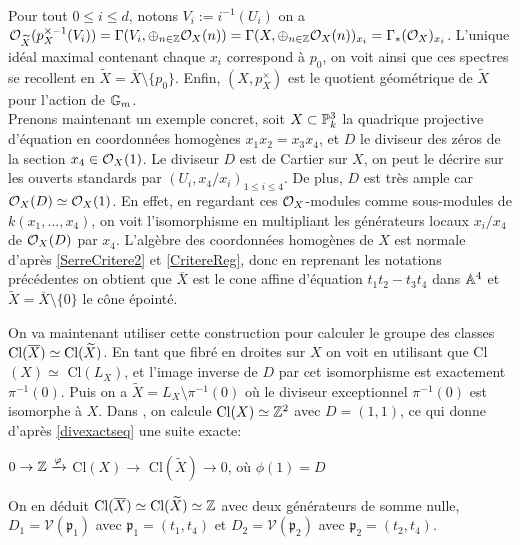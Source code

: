 	\begin{center}
	\\
	\end{center}
Pour tout $0\leq i\leq d$, notons $V_i:=i^{-1}(U_i)$ on a  $\mathcal{O}_{\widetilde{X}}(p_X^{\times-1}(V_i))=\Gamma(V_i,\oplus_{n\in \mathbb{Z}}\mathcal{O}_X(n))=\Gamma(X,\oplus_{n\in \mathbb{Z}}\mathcal{O}_X(n))_{x_i}=\Gamma_*(\mathcal{O}_X)_{x_i}$. L'unique idéal maximal contenant chaque $x_i$ correspond à $p_0$, on voit ainsi que ces spectres se recollent en $\widetilde{X}=\overline{X}\setminus \lbrace p_0 \rbrace$. Enfin, $(X,p^\times_X)$ est le quotient géométrique de $\widetilde{X}$ pour l'action de $\mathbb{G}_m$.\\

Prenons maintenant un exemple concret, soit $X\subset \mathbb{P}^3_k$ la quadrique projective d'équation en coordonnées homogènes $x_1x_2=x_3x_4$, et $D$ le diviseur des zéros de la section $x_4\in\mathcal{O}_X(1)$. Le diviseur $D$ est de Cartier sur $X$, on peut le décrire sur les ouverts standards par $(U_i, x_4/x_i)_{1\leq i\leq 4}$. De plus, $D$ est très ample car $\mathcal{O}_X(D)\simeq \mathcal{O}_X(1)$. En effet, en regardant ces $\mathcal{O}_X$-modules comme sous-modules de $k(x_1,...,x_4)$, on voit l'isomorphisme en multipliant les générateurs locaux $x_i/x_4$ de $\mathcal{O}_X(D)$ par $x_4$. L'algèbre des coordonnées homogènes de $X$ est normale d'après \ref{SerreCritere2} et \ref{CritereReg}, donc en reprenant les notations précédentes on obtient que $\overline{X}$ est le cone affine d'équation $t_1t_2-t_3t_4$ dans $\mathbb{A}^4$ et $\widetilde{X}=\overline{X}\setminus\lbrace 0 \rbrace$ le cône épointé. 

On va maintenant utiliser cette construction pour calculer le groupe des classes $\operatorname{Cl}(\overline{X})\simeq \operatorname{Cl}(\widetilde{X})$. En tant que fibré en droites sur $X$ on voit en utilisant \cite[II.6.6]{Hartshorne} que Cl$(X)\simeq$ Cl$(L_X)$, et l'image inverse de $D$ par cet isomorphisme est exactement $\pi^{-1}(0)$. Puis on a $\widetilde{X}=L_X \setminus \pi^{-1}(0)$ où le diviseur exceptionnel $\pi^{-1}(0)$ est isomorphe à $X$. Dans \cite[II.6.6.1]{Hartshorne}, on calcule $\operatorname{Cl}(X)\simeq \mathbb{Z}^2$ avec $D=(1,1)$, ce qui donne d'après \ref{divexactseq} une suite exacte:
\begin{center}
$ 0\rightarrow\mathbb{Z}\xrightarrow{\varphi}$ Cl$(X) \rightarrow$ Cl$(\widetilde{X}) \rightarrow 0$, où $\phi(1)=D$
\end{center}
On en déduit $\operatorname{Cl}(\overline{X})\simeq\operatorname{Cl}(\widetilde{X})\simeq \mathbb{Z}$ avec deux générateurs de somme nulle, $D_1=\mathcal{V}(\mathfrak{p}_1)$ avec $\mathfrak{p}_1=(t_1,t_4)$ et $D_2=\mathcal{V}(\mathfrak{p}_2)$ avec $\mathfrak{p}_2=(t_2,t_4)$.\\

